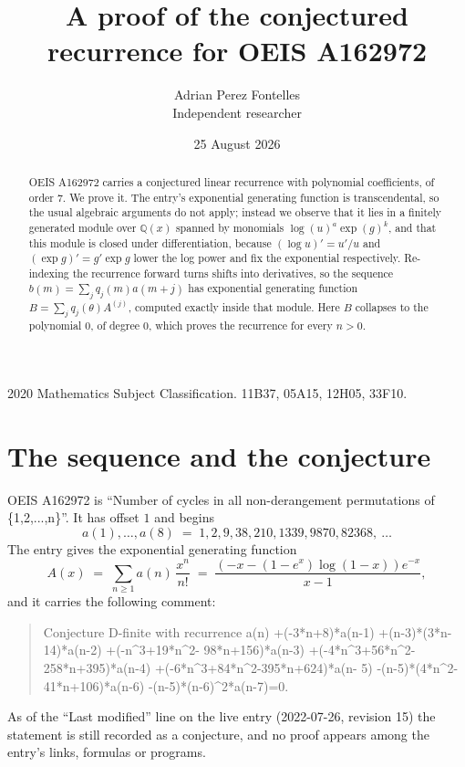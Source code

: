\documentclass[11pt,a4paper]{article}
\title{A proof of the conjectured recurrence for OEIS A162972}
\author{Adrian Perez Fontelles\\ \small Independent researcher}
\date{25 August 2026}
\theoremstyle{plain}
\theoremstyle{definition}
\begin{document}
\maketitle

\begin{abstract}
OEIS A162972 carries a conjectured linear recurrence with polynomial coefficients, of
order 7. We prove it. The entry's exponential generating function is
transcendental, so the usual algebraic arguments do not apply; instead we observe that it
lies in a finitely generated module over $\mathbb{Q}(x)$ spanned by monomials
$\log(u)^{a}\exp(g)^{k}$, and that this module is closed under differentiation, because
$(\log u)'=u'/u$ and $(\exp g)'=g'\exp g$ lower the log power and fix the exponential
respectively. Re-indexing the recurrence forward turns shifts into derivatives, so the
sequence $b(m)=\sum_{j}q_{j}(m)a(m+j)$ has exponential generating function
$B=\sum_{j}q_{j}(\theta)A^{(j)}$, computed exactly inside that module. Here $B$ collapses
to the polynomial $0$, of degree $0$, which proves the recurrence for every
$n>0$.
\end{abstract}

\noindent\small 2020 Mathematics Subject Classification. 11B37, 05A15, 12H05, 33F10.\normalsize

\section{The sequence and the conjecture}

OEIS A162972 is ``Number of cycles in all non-derangement permutations of \{1,2,...,n\}''. It has offset $1$ and begins
\[
a(1),\dots,a(8)\;=\;1, 2, 9, 38, 210, 1339, 9870, 82368,\ \dots
\]
The entry gives the exponential generating function
\begin{equation}\label{eq:gf}
A(x)\;=\;\sum_{n\ge 1} a(n)\,\frac{x^{n}}{n!}\;=\;\frac{\left(- x - \left(1 - e^{x}\right) \log{\left(1 - x \right)}\right) e^{- x}}{x - 1} ,
\end{equation}
and it carries the following comment:
\begin{quote}\small
Conjecture D-finite with recurrence a(n) +(-3*n+8)*a(n-1) +(n-3)*(3*n-14)*a(n-2) +(-n\textasciicircum{}3+19*n\textasciicircum{}2- 98*n+156)*a(n-3) +(-4*n\textasciicircum{}3+56*n\textasciicircum{}2-258*n+395)*a(n-4) +(-6*n\textasciicircum{}3+84*n\textasciicircum{}2-395*n+624)*a(n- 5) -(n-5)*(4*n\textasciicircum{}2-41*n+106)*a(n-6) -(n-5)*(n-6)\textasciicircum{}2*a(n-7)=0.
\end{quote}
As of the ``Last modified'' line on the live entry (2022-07-26, revision 15) the
statement is still recorded as a conjecture, and no proof appears among the entry's links,
formulas or programs.
\end{document}
